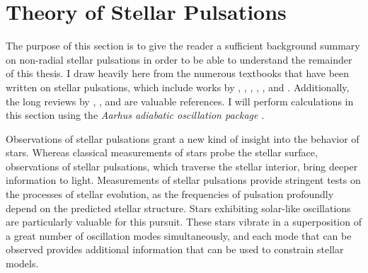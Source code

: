 \section{Theory of Stellar Pulsations} 
\label{sec:pulsation}
\begin{shaded}
\noindent The purpose of this section is to give the reader a sufficient background summary on non-radial stellar pulsations in order to be able to understand the remainder of this thesis. 
I draw heavily here from the numerous textbooks that have been written on stellar pulsations, which include works by \cite{1926ics..book.....E}, \cite{1949ptvs.book.....R}, \cite{1979nos..book.....U}, \cite{1980tsp..book.....C}, \cite{2010aste.book.....a}, and \cite{basuchaplin2017}. 
Additionally, the long reviews by \cite{1958HDP....51..353L}, \citet{1993afd..conf..399G}, and \citet{2016lrsp...13....2b} are valuable references.
I will perform calculations in this section using the \emph{Aarhus adiabatic oscillation package} \citep[\textsc{ADIPLS},][]{2008Ap&SS.316..113C}. 
\end{shaded}

Observations of stellar pulsations grant a new kind of insight into the behavior of stars. 
Whereas classical measurements of stars probe the stellar surface, observations of stellar pulsations, which traverse the stellar interior, bring deeper information to light. 
Measurements of stellar pulsations provide stringent tests on the processes of stellar evolution, as the frequencies of pulsation profoundly depend on the predicted stellar structure. 
Stars exhibiting solar-like oscillations are particularly valuable for this pursuit. 
These stars vibrate in a superposition of a great number of oscillation modes simultaneously, and each mode that can be observed provides additional information that can be used to constrain stellar models. 

